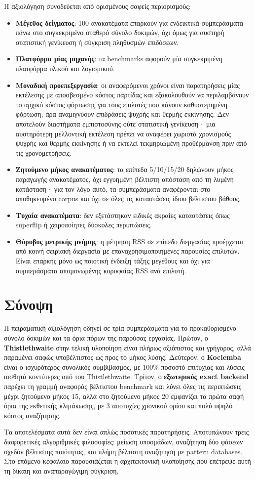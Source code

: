 Η αξιολόγηση συνοδεύεται από ορισμένους σαφείς περιορισμούς:
\begin{itemize}
    \item \textbf{Μέγεθος δείγματος}: 100 ανακατέματα επαρκούν για ενδεικτικά συμπεράσματα πάνω στο συγκεκριμένο σταθερό σύνολο δοκιμών, όχι όμως για αυστηρή στατιστική γενίκευση ή σύγκριση πληθυσμών επιδόσεων.
    \item \textbf{Πλατφόρμα μίας μηχανής}: τα benchmarks αφορούν μία συγκεκριμένη πλατφόρμα υλικού και λογισμικού.
    \item \textbf{Μοναδική προεπεξεργασία}: οι αναφερόμενοι χρόνοι είναι
    παρατηρήσεις μίας εκτέλεσης με αποσβεσμένο κόστος παρτίδας και εξακολουθούν να περιλαμβάνουν το αρχικό κόστος
    φόρτωσης για τους επιλυτές που κάνουν καθυστερημένη φόρτωση, άρα αναμιγνύουν επιδράσεις ψυχρής
    και θερμής εκκίνησης. Δεν αποτελούν διαστήματα εμπιστοσύνης ούτε
    στατιστική γενίκευση· μια αυστηρότερη μελλοντική εκτέλεση πρέπει να αναφέρει
    χωριστά χρονισμούς ψυχρής και θερμής εκκίνησης ή να εκτελεί τεκμηριωμένη προθέρμανση
    πριν από τις χρονομετρήσεις.
    \item \textbf{Ζητούμενο μήκος ανακατέματος}: τα επίπεδα 5/10/15/20 δηλώνουν μήκος παραγωγής ανακατέματος, όχι εγγυημένη βέλτιστη απόσταση από τη λυμένη κατάσταση· για τον λόγο αυτό, τα συμπεράσματα αναφέρονται στο αποθηκευμένο corpus και όχι σε όλες τις καταστάσεις ίδιου βέλτιστου βάθους.
    \item \textbf{Τυχαία ανακατέματα}: δεν εξετάστηκαν ειδικές ακραίες καταστάσεις όπως superflip ή χειροποίητες δύσκολες περιπτώσεις.
    \item \textbf{Θόρυβος μετρικής μνήμης}: η μέτρηση RSS σε επίπεδο διεργασίας προέρχεται από κοινή σειριακή διεργασία με επαναχρησιμοποιημένες παρουσίες επιλυτών. Είναι επαρκής μόνο ως ποιοτική ένδειξη τάξης μεγέθους και όχι για συμπεράσματα απομονωμένης κορυφαίας RSS ανά επιλυτή.
\end{itemize}

\section{Σύνοψη}

Η πειραματική αξιολόγηση οδηγεί σε τρία συμπεράσματα για το προκαθορισμένο σύνολο δοκιμών και τα όρια πόρων της παρούσας εργασίας. Πρώτον, ο
\textbf{Thistlethwaite} στην τελική υλοποίηση είναι πλήρως αξιόπιστος
και γρήγορος, αλλά παραμένει σαφώς υποβέλτιστος ως προς το μήκος λύσης.
Δεύτερον, ο \textbf{Kociemba} είναι ο ισχυρότερος συνολικός συμβιβασμός, με
100\% ποσοστό επιτυχίας και λύσεις αισθητά κοντύτερες από του Thistlethwaite.
Τρίτον, ο \textbf{εξωτερικός exact backend} παρέχει τη γραμμή αναφοράς βέλτιστου benchmark και
λύνει όλες τις περιπτώσεις μέχρι ζητούμενο μήκος 15, αλλά στο ζητούμενο μήκος 20 εμφανίζει τα
πρώτα σαφή όρια της εκθετικής κλιμάκωσης, με 3 αποτυχίες χρονικού ορίου και πολύ
υψηλό κόστος αναζήτησης.

Τα αποτελέσματα αυτά δεν είναι απλώς ποσοτικές παρατηρήσεις. Αποτυπώνουν τρεις
διαφορετικές αλγοριθμικές φιλοσοφίες: μείωση υποομάδων, αναζήτηση δύο φάσεων
σχεδόν βέλτιστης ποιότητας, και πλήρη βέλτιστη αναζήτηση με pattern databases. Στο επόμενο κεφάλαιο
παρουσιάζεται η αρχιτεκτονική υλοποίησης που επέτρεψε αυτή τη δίκαιη και
αναπαραγώγιμη σύγκριση.
